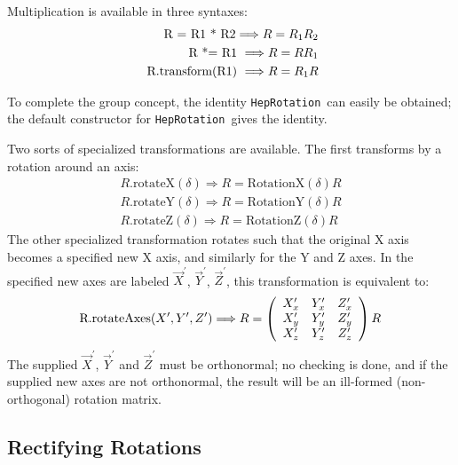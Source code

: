 \documentclass[twoside,12pt]{article}
\def \Ro {{\tt HepRotation}}
\begin{document}
Multiplication is available in three syntaxes:
\begin{eqnarray}
\label{eq:opmulrot}
	\mbox{ R = R1 * R2} \Longrightarrow {\boldmath R = R_1 R_2}
\label{eq:opstrot}
	\\
	\mbox{ R *= R1 } \Longrightarrow {\boldmath R = R R_1 }
	\\
\label{eq:transrot}
	\mbox{ R.transform(R1) } \Longrightarrow {\boldmath R = R_1 R }
\end{eqnarray}

To complete the group concept, the identity \Ro\ can easily be obtained; the
default constructor for \Ro\ gives the identity.

Two sorts of specialized transformations are available.  The first transforms
by a rotation around an axis:
\begin{eqnarray}
\label{eq:xyzrot}
  R\mbox{.rotateX}(\delta) \Longrightarrow R = \mbox{RotationX}(\delta) R \\
\nonumber
  R\mbox{.rotateY}(\delta) \Longrightarrow R = \mbox{RotationY}(\delta) R \\
\nonumber
  R\mbox{.rotateZ}(\delta) \Longrightarrow R = \mbox{RotationZ}(\delta) R 
\end{eqnarray}
\noindent
The other specialized transformation rotates such that the original X axis
becomes a specified new X axis, and similarly for the Y and Z axes.
In the specified new axes are labeled $\vec{X}^\prime$, $\vec{Y}^\prime$, 
$\vec{Z}^\prime$, this transformation is equivalent to:
\begin{equation}
\label{eq:rotaxes}
\mbox{R.rotateAxes}(X^\prime, Y^\prime, Z^\prime) \Longrightarrow
{\boldmath R} = 
\left(
\begin{array}{ccc}
X^\prime_x & Y^\prime_x & Z^\prime_x \\
X^\prime_y & Y^\prime_y & Z^\prime_y \\
X^\prime_z & Y^\prime_z & Z^\prime_z 
\end{array}
\right)
{\boldmath R} 
\end{equation}
\noindent
The supplied 
$\vec{X}^\prime$, $\vec{Y}^\prime$ and $\vec{Z}^\prime$ must be orthonormal;
no checking is done, and if the supplied new axes are not orthonormal, the
result will be an ill-formed (non-orthogonal) rotation matrix.

\subsection{Rectifying Rotations}
\end{document}
